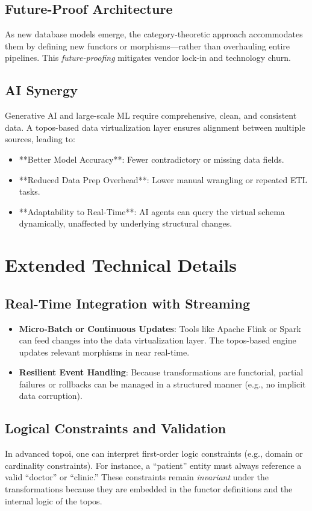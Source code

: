 \documentclass[11pt]{article}
\begin{document}
\subsection{Future-Proof Architecture}
As new database models emerge, the category-theoretic approach accommodates them by defining new functors or morphisms—rather than overhauling entire pipelines. This \emph{future-proofing} mitigates vendor lock-in and technology churn.

\subsection{AI Synergy}
Generative AI and large-scale ML require comprehensive, clean, and consistent data. A topos-based data virtualization layer ensures alignment between multiple sources, leading to:
\begin{itemize}
\item **Better Model Accuracy**: Fewer contradictory or missing data fields.
\item **Reduced Data Prep Overhead**: Lower manual wrangling or repeated ETL tasks.
\item **Adaptability to Real-Time**: AI agents can query the virtual schema dynamically, unaffected by underlying structural changes.
\end{itemize}

\section{Extended Technical Details}

\subsection{Real-Time Integration with Streaming}
\begin{itemize}
\item \textbf{Micro-Batch or Continuous Updates}: Tools like Apache Flink or Spark can feed changes into the data virtualization layer. The topos-based engine updates relevant morphisms in near real-time.
\item \textbf{Resilient Event Handling}: Because transformations are functorial, partial failures or rollbacks can be managed in a structured manner (e.g., no implicit data corruption).
\end{itemize}

\subsection{Logical Constraints and Validation}
In advanced topoi, one can interpret first-order logic constraints (e.g., domain or cardinality constraints). For instance, a “patient” entity must always reference a valid “doctor” or “clinic.” These constraints remain \emph{invariant} under the transformations because they are embedded in the functor definitions and the internal logic of the topos.
\end{document}
